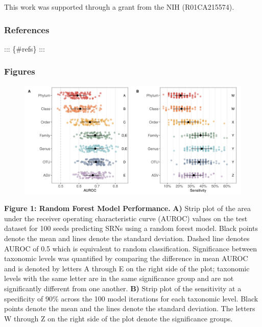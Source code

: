 \documentclass[]{article}
\begin{document}
This work was supported through a grant from the NIH (R01CA215574).

\newpage

\subsubsection{References}\label{references}

::: \{\#refs\} :::

\newpage

\subsubsection{Figures}\label{figures}

\begin{figure}[htbp]
\centering
\includegraphics{figure_1.png}
\end{figure}

\textbf{Figure 1: Random Forest Model Performance.} \textbf{A)} Strip
plot of the area under the receiver operating characteristic curve
(AUROC) values on the test dataset for 100 seeds predicting SRNs using a
random forest model. Black points denote the mean and lines denote the
standard deviation. Dashed line denotes AUROC of 0.5 which is equivalent
to random classification. Significance between taxonomic levels was
quantified by comparing the difference in mean AUROC and is denoted by
letters A through E on the right side of the plot; taxonomic levels with
the same letter are in the same significance group and are not
significantly different from one another. \textbf{B)} Strip plot of the
sensitivity at a specificity of 90\% across the 100 model iterations for
each taxonomic level. Black points denote the mean and the lines denote
the standard deviation. The letters W through Z on the right side of the
plot denote the significance groups.

\newpage
\end{document}

